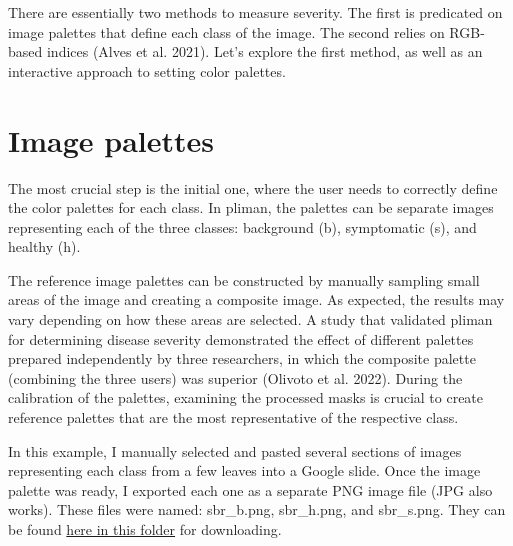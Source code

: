 \documentclass[
  letterpaper,
]{book}
\begin{document}
There are essentially two methods to measure severity. The first is
predicated on image palettes that define each class of the image. The
second relies on RGB-based indices (Alves et al. 2021). Let's explore
the first method, as well as an interactive approach to setting color
palettes.

\hypertarget{image-palettes}{%
\section{Image palettes}\label{image-palettes}}

The most crucial step is the initial one, where the user needs to
correctly define the color palettes for each class. In pliman, the
palettes can be separate images representing each of the three classes:
background (b), symptomatic (s), and healthy (h).

The reference image palettes can be constructed by manually sampling
small areas of the image and creating a composite image. As expected,
the results may vary depending on how these areas are selected. A study
that validated pliman for determining disease severity demonstrated the
effect of different palettes prepared independently by three
researchers, in which the composite palette (combining the three users)
was superior (Olivoto et al. 2022). During the calibration of the
palettes, examining the processed masks is crucial to create reference
palettes that are the most representative of the respective class.

In this example, I manually selected and pasted several sections of
images representing each class from a few leaves into a Google slide.
Once the image palette was ready, I exported each one as a separate PNG
image file (JPG also works). These files were named: sbr\_b.png,
sbr\_h.png, and sbr\_s.png. They can be found
\href{https://github.com/emdelponte/epidemiology-R/tree/main/imgs}{here
in this folder} for downloading.
\end{document}
